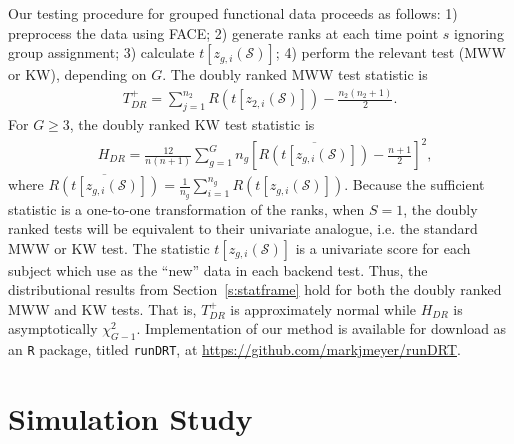 \documentclass[12pt]{article}
\theoremstyle{plain}
\begin{document}
	Our testing procedure for grouped functional data proceeds as follows: 1) preprocess the data using FACE; 2) generate ranks at each time point $s$ ignoring group assignment; 3) calculate $t[z_{g,i}(\mathcal{S})]$; 4) perform the relevant test (MWW or KW), depending on $G$. The doubly ranked MWW test statistic is
	\begin{align*}
		T_{DR}^+ = \sum_{j=1}^{n_2} R\left( t\left[z_{2,i}(\mathcal{S})\right] \right) - \frac{n_2(n_2 + 1)}{2}.
	\end{align*}
	For $G \geq 3$, the doubly ranked KW test statistic is
	\begin{align*}
		&H_{DR} = \frac{12}{n(n+1)} \sum_{g = 1}^G n_{g} \left[ \overline{R\left( t\left[z_{g,i}(\mathcal{S})\right] \right)} - \frac{n+1}{2}\right]^2,
	\end{align*}
	where $\overline{R\left( t\left[z_{g,i}(\mathcal{S})\right] \right)} = \frac{1}{n_g} \sum_{i=1}^{n_g} R\left( t\left[z_{g,i}(\mathcal{S})\right] \right)$. Because the sufficient statistic is a one-to-one transformation of the ranks, when $S = 1$, the doubly ranked tests will be equivalent to their univariate analogue, i.e. the standard MWW or KW test. The statistic $t\left[z_{g,i}(\mathcal{S})\right]$ is a univariate score for each subject which use as the ``new'' data in each backend test. Thus, the distributional results from Section~\ref{s:statframe} hold for both the doubly ranked MWW and KW tests. That is, $T_{DR}^+$ is approximately normal while $H_{DR}$ is asymptotically $\chi_{G-1}^2$. 
	Implementation of our method is available for download as an \texttt{R} package, titled \texttt{runDRT}, at \url{https://github.com/markjmeyer/runDRT}.
	


	\section{Simulation Study}
	\label{s:sim}
	
\end{document}
